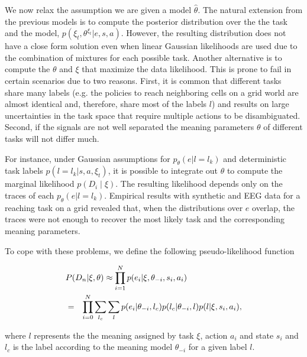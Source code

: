 
We now relax the assumption we are given a model $\hat{\theta}$. The natural extension from the previous models is to compute the posterior distribution over the the task and the model, $p(\xi_t, \theta^{\xi_t} |e, s, a)$. However, the resulting distribution does not have a close form solution even when linear Gaussian likelihoods are used due to the combination of mixtures for each possible task. Another alternative is to compute the $\theta$ and $\xi$ that maximize the data likelihood. This is prone to fail in certain scenarios due to two reasons. First, it is common that different tasks share many labels (e.g. the policies to reach neighboring cells on a grid world are almost identical and, therefore, share most of the labels $l$) and results on large uncertainties in the task space that require multiple actions to be disambiguated. Second, if the signals are not well separated the meaning parameters $\theta$ of different tasks will not differ much.  

For instance, under Gaussian assumptions for $p_{\theta}(e |l = l_k)$ and deterministic task labels $p(l = l_k| s, a, \xi_t)$, it is possible to integrate out  $\theta$ to compute the marginal likelihood $p(D_i\mid \xi)$. The resulting likelihood depends only on the traces of each $p_{\theta}(e |l = l_k)$. Empirical results with synthetic and EEG data for a reaching task on a grid revealed that, when the distributions over $e$ overlap, the traces were not enough to recover the most likely task and the corresponding meaning parameters. 

To cope with these problems, we define the following pseudo-likelihood function 

\begin{eqnarray}\label{eq:pseudo1}
\lefteqn{P(D_n | \xi, \theta) \approx \prod_{i=1}^N p(e_i | \xi, \theta_{-i},s_i,a_i)}  \\ \label{eq:pseudo2}
&=& \prod_{i=0}^N \sum_{l_c}\sum_l  p(e_i | \theta_{-i}, l_c)  p(l_c | \theta_{-i},l) p(l|\xi,s_i,a_i), 
\label{eq:}
\end{eqnarray}

where $l$ represents the the meaning assigned by task $\xi$, action $a_i$ and state $s_i$ and $l_c$ is the label according to the meaning model $\theta_{-i}$ for a given label $l$.

